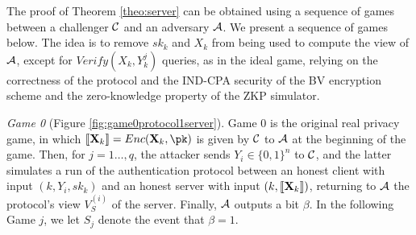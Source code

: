 The proof of Theorem \ref{theo:server} can be obtained using a sequence of games
between a challenger $\mathcal{C}$ and an adversary $\mathcal{A}$. We present a
sequence of games below. The idea is to remove $sk_k$ and $X_k$ from being used
to compute the view of $\mathcal{A}$, except for $Verify(X_k,Y_k^{j})$ queries, as
in the ideal game, relying on the correctness of the protocol and the IND-CPA
security of the BV encryption scheme and the zero-knowledge property of the ZKP
simulator.

\textit{Game 0} (Figure \ref{fig:game0protocol1server}). Game 0 is the original real privacy game, in which
$\enc{\mathbf{X}_{k}} = Enc(\mathbf{X}_{k},\pk)$ is given by $\mathcal{C}$ to
$\mathcal{A}$ at the beginning of the game. Then, for $j=1\ldots,q$, the attacker
sends $Y_i \in \{0,1\}^n$ to $\mathcal{C}$, and the latter simulates a run
of the authentication protocol between an honest client with input
$(k,Y_i, sk_k)$ and an honest server with input $(k,\left\llbracket\mathbf{X}_{k}\right\rrbracket)$, returning to
$\mathcal{A}$ the protocol's view $V^{(i)}_S$ of the server. Finally, $\mathcal{A}$
outputs a bit $\beta$. In the following Game $j$, we let $S_j$ denote the event
that $\beta=1$.

